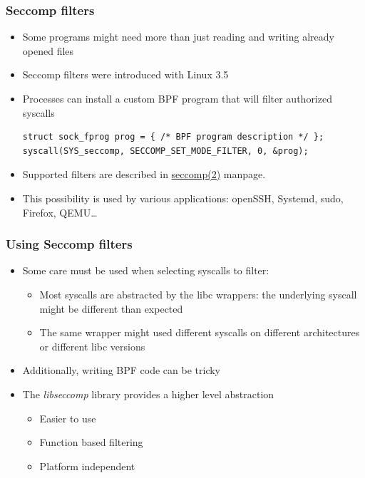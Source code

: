 \begin{frame}[fragile]
	\frametitle{Seccomp filters}
	\begin{itemize}
		\item Some programs might need more than just reading and writing already
			opened files
		\item Seccomp filters were introduced with Linux 3.5
		\item Processes can install a custom BPF program that will filter authorized
			syscalls
			\begin{block}{}
				{\tiny
				\begin{verbatim}
struct sock_fprog prog = { /* BPF program description */ };
syscall(SYS_seccomp, SECCOMP_SET_MODE_FILTER, 0, &prog);
\end{verbatim}
}
			\end{block}
		\item Supported filters are described in
			\href{https://manned.org/seccomp.2}{seccomp(2)} manpage.
		\item This possibility is used by various applications: openSSH, Systemd,
			sudo, Firefox, QEMU\ldots
	\end{itemize}
\end{frame}

\begin{frame}
	\frametitle{Using Seccomp filters}
	\begin{itemize}
		\item Some care must be used when selecting syscalls to filter:
			\begin{itemize}
				\item Most syscalls are abstracted by the libc wrappers: the underlying
					syscall might be different than expected
				\item The same wrapper might used different syscalls on different
					architectures or different libc versions
			\end{itemize}
		\item Additionally, writing BPF code can be tricky
		\item The \emph{libseccomp} library provides a higher level abstraction
			\begin{itemize}
				\item Easier to use
				\item Function based filtering
				\item Platform independent
			\end{itemize}
	\end{itemize}
\end{frame}

